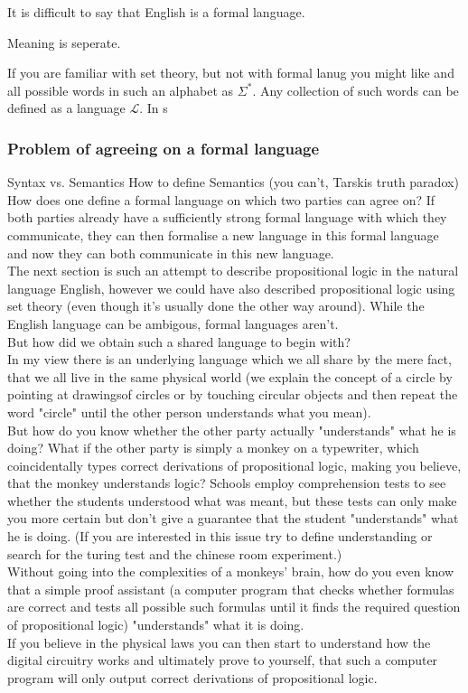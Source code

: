 It is difficult to say that English is a formal language.


Meaning is seperate.

If you are familiar with set theory, but not with formal lanug
you might like and all possible words in such an alphabet as $\Sigma^*$.
Any collection of such words can be defined as a language $\mathcal{L}$.
In s



\subsubsection{Problem of agreeing on a formal language}
Syntax vs. Semantics
How to define Semantics (you can't, Tarskis truth paradox)
How does one define a formal language on which two parties can agree on?
If both parties already have a sufficiently strong formal language with which they communicate, they can then formalise a new language in this formal language and now they can both communicate in this new language. \\
The next section is such an attempt to describe propositional logic in the natural language English, however we could have also described propositional logic using set theory (even though it's usually done the other way around). While the English language can be ambigous, formal languages aren't. \\
But how did we obtain such a shared language to begin with? \\
In my view there is an underlying language which we all share by the mere fact, that we all live in the same physical world (we explain the concept of a circle by pointing at drawingsof circles or by touching circular objects and then repeat the word "circle" until the other person understands what you mean). \\
But how do you know whether the other party actually "understands" what he is doing? What if the other party is simply a monkey on a typewriter, which coincidentally types correct derivations of propositional logic, making you believe, that the monkey understands logic? Schools employ comprehension tests to see whether the students understood what was meant, but these tests can only make you more certain but don't give a guarantee that the student "understands" what he is doing. (If you are interested in this issue try to define understanding or search for the turing test and the chinese room experiment.) \\

Without going into the complexities of a monkeys' brain, how do you even know that a simple proof assistant (a computer program that checks whether formulas are correct and tests all possible such formulas until it finds the required question of propositional logic) "understands" what it is doing. \\
If you believe in the physical laws you can then start to understand how the digital circuitry works and ultimately prove to yourself, that such a computer program will only output correct derivations of propositional logic. \\

